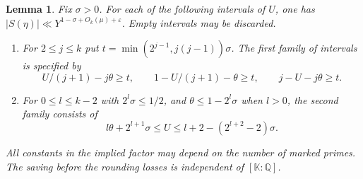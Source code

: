 \documentclass[11pt,letterpaper]{article}
\newtheorem{lemma}[lemma]{Lemma}
\theoremstyle{definition}
\numberwithin{equation}{section}
\begin{document}
\begin{lemma}\label{lem:nf-fibre-savings}
Fix $\sigma>0$. For each of the following intervals of $U$, one has
$|S(\eta)|\ll Y^{1-\sigma+O_k(\mu)+\varepsilon}$. Empty intervals
may be discarded.
\begin{enumerate}
\item For $2\le j\le k$ put $t=\min(2^{j-1},j(j-1))\sigma$.
The first family of intervals is specified by
\[
 U/(j+1)-j\theta\ge t,\qquad
 1-U/(j+1)-\theta\ge t,\qquad j-U-j\theta\ge t .
\]
\item For $0\le l\le k-2$ with $2^l\sigma\le1/2$, and
$\theta\le1-2^l\sigma$ when $l>0$, the second family consists of
\[
 l\theta+2^{l+1}\sigma\le U\le
      l+2-(2^{l+2}-2)\sigma .
\]
\end{enumerate}
All constants in the implied factor may depend on the number of marked
primes. The saving before the rounding losses is independent of
$[\mathbb K:\mathbb Q]$.
\end{lemma}
\end{document}
